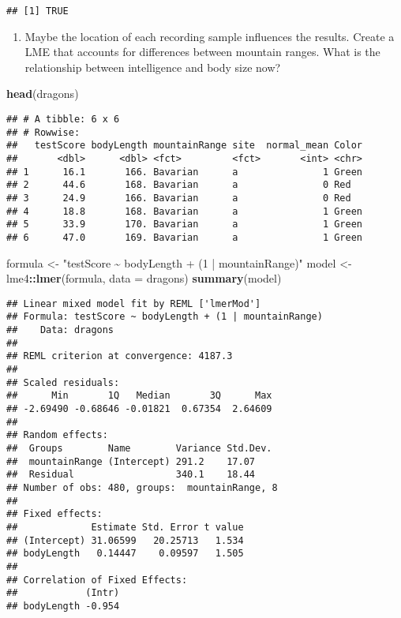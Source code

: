\documentclass[
]{article}
\newenvironment{Shaded}{\begin{snugshade}}{\end{snugshade}}
\newcommand{\AttributeTok}[1]{\textcolor[rgb]{0.13,0.29,0.53}{#1}}
\newcommand{\FunctionTok}[1]{\textcolor[rgb]{0.13,0.29,0.53}{\textbf{#1}}}
\newcommand{\NormalTok}[1]{#1}
\newcommand{\OtherTok}[1]{\textcolor[rgb]{0.56,0.35,0.01}{#1}}
\newcommand{\SpecialCharTok}[1]{\textcolor[rgb]{0.81,0.36,0.00}{\textbf{#1}}}
\newcommand{\StringTok}[1]{\textcolor[rgb]{0.31,0.60,0.02}{#1}}
\providecommand{\tightlist}{%
  \setlength{\itemsep}{0pt}\setlength{\parskip}{0pt}}
\begin{document}
\begin{verbatim}
## [1] TRUE
\end{verbatim}

\begin{enumerate}
\def\labelenumi{\alph{enumi})}
\setcounter{enumi}{1}
\tightlist
\item
  Maybe the location of each recording sample influences the results.
  Create a LME that accounts for differences between mountain ranges.
  What is the relationship between intelligence and body size now?
\end{enumerate}

\begin{Shaded}
\begin{Highlighting}[]
\FunctionTok{head}\NormalTok{(dragons)}
\end{Highlighting}
\end{Shaded}

\begin{verbatim}
## # A tibble: 6 x 6
## # Rowwise: 
##   testScore bodyLength mountainRange site  normal_mean Color
##       <dbl>      <dbl> <fct>         <fct>       <int> <chr>
## 1      16.1       166. Bavarian      a               1 Green
## 2      44.6       168. Bavarian      a               0 Red  
## 3      24.9       166. Bavarian      a               0 Red  
## 4      18.8       168. Bavarian      a               1 Green
## 5      33.9       170. Bavarian      a               1 Green
## 6      47.0       169. Bavarian      a               1 Green
\end{verbatim}

\begin{Shaded}
\begin{Highlighting}[]
\NormalTok{formula }\OtherTok{\textless{}{-}} \StringTok{"testScore \textasciitilde{} bodyLength + (1 | mountainRange)"}
\NormalTok{model }\OtherTok{\textless{}{-}}\NormalTok{ lme4}\SpecialCharTok{::}\FunctionTok{lmer}\NormalTok{(formula, }\AttributeTok{data =}\NormalTok{ dragons)}
\FunctionTok{summary}\NormalTok{(model)}
\end{Highlighting}
\end{Shaded}

\begin{verbatim}
## Linear mixed model fit by REML ['lmerMod']
## Formula: testScore ~ bodyLength + (1 | mountainRange)
##    Data: dragons
## 
## REML criterion at convergence: 4187.3
## 
## Scaled residuals: 
##      Min       1Q   Median       3Q      Max 
## -2.69490 -0.68646 -0.01821  0.67354  2.64609 
## 
## Random effects:
##  Groups        Name        Variance Std.Dev.
##  mountainRange (Intercept) 291.2    17.07   
##  Residual                  340.1    18.44   
## Number of obs: 480, groups:  mountainRange, 8
## 
## Fixed effects:
##             Estimate Std. Error t value
## (Intercept) 31.06599   20.25713   1.534
## bodyLength   0.14447    0.09597   1.505
## 
## Correlation of Fixed Effects:
##            (Intr)
## bodyLength -0.954
\end{verbatim}
\end{document}
